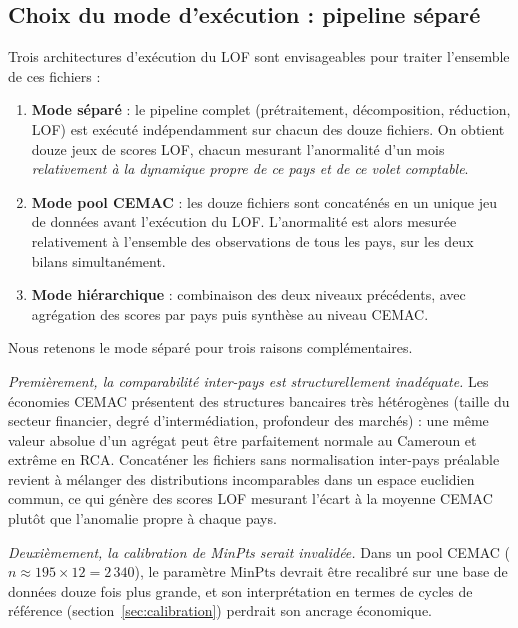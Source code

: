 \documentclass[12pt, a4paper]{article}
\begin{document}
\subsection{Choix du mode d'exécution : pipeline séparé}
\label{subsec:mode_execution}

Trois architectures d'exécution du LOF sont envisageables pour traiter
l'ensemble de ces fichiers :

\begin{enumerate}
    \item \textbf{Mode séparé} : le pipeline complet (prétraitement,
    décomposition, réduction, LOF) est exécuté indépendamment sur chacun
    des douze fichiers. On obtient douze jeux de scores LOF, chacun mesurant
    l'anormalité d'un mois \textit{relativement à la dynamique propre de
    ce pays et de ce volet comptable}.

    \item \textbf{Mode pool CEMAC} : les douze fichiers sont concaténés en
    un unique jeu de données avant l'exécution du LOF. L'anormalité est
    alors mesurée relativement à l'ensemble des observations de tous les pays,
    sur les deux bilans simultanément.

    \item \textbf{Mode hiérarchique} : combinaison des deux niveaux
    précédents, avec agrégation des scores par pays puis synthèse au
    niveau CEMAC.
\end{enumerate}

Nous retenons le mode séparé pour trois raisons complémentaires.

\textit{Premièrement, la comparabilité inter-pays est structurellement
inadéquate.}
Les économies CEMAC présentent des structures bancaires très hétérogènes
(taille du secteur financier, degré d'intermédiation, profondeur des marchés) :
une même valeur absolue d'un agrégat peut être parfaitement normale au Cameroun
et extrême en RCA. Concaténer les fichiers sans normalisation inter-pays
préalable revient à mélanger des distributions incomparables dans un espace
euclidien commun, ce qui génère des scores LOF mesurant l'écart à la moyenne
CEMAC plutôt que l'anomalie propre à chaque pays.

\textit{Deuxièmement, la calibration de MinPts serait invalidée.}
Dans un pool CEMAC ($n \approx 195 \times 12 = 2\,340$), le paramètre
$\text{MinPts}$ devrait être recalibré sur une base de données douze fois
plus grande, et son interprétation en termes de \og{}cycles de
référence\fg{} (section~\ref{sec:calibration}) perdrait son ancrage
économique.
\end{document}

